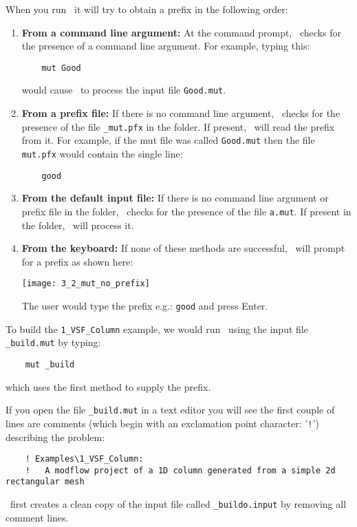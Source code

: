 When you run \mut\, it will try to obtain a prefix in the following order:
\begin{enumerate}
    \item \textbf{From a command line argument:} \label{commarg} At the command prompt, \mut\ checks for the presence of a command line argument.  For example, typing this:
\begin{verbatim}
    mut Good
\end{verbatim}
        would cause \mut\ to process the input file \texttt{Good.mut}.
    \item \textbf{From a prefix file:} If there is no command line argument, \mut\ checks for the presence of the file \texttt{\_mut.pfx} in the folder.  If present, \mut\ will read the prefix from it. For example, if the mut file was called \texttt{Good.mut} then the file \texttt{mut.pfx} would contain the single line:
\begin{verbatim}
    good
\end{verbatim}
    \item \textbf{From the default input file:} If there is no command line argument or prefix file in the folder, \mut\ checks for the presence of the file \texttt{a.mut}.  If present in the folder, \mut\ will process it.
    \item \textbf{From the keyboard:} If none of these methods are successful, \mut\ will prompt for a prefix as shown here:

        \texttt{[image: 3\_2\_mut\_no\_prefix]}

        The user would type the prefix e.g.: \texttt{good} and press Enter.

\end{enumerate}

To build the \texttt{1\_VSF\_Column} example, we would  run \mut\ using the input file \texttt{\_build.mut} by typing:
\begin{verbatim}
    mut _build
\end{verbatim}
which uses the first method to supply the prefix.


If you open the file \texttt{\_build.mut} in a text editor you will see the first couple of lines are comments (which begin with an exclamation point character: '{\tt !}') describing the problem:
\squish
\begin{verbatim}
    ! Examples\1_VSF_Column:
    !   A modflow project of a 1D column generated from a simple 2d rectangular mesh
\end{verbatim}
 \mut\ first creates a clean copy of the input file called \texttt{\_buildo.input} by removing all comment lines.

